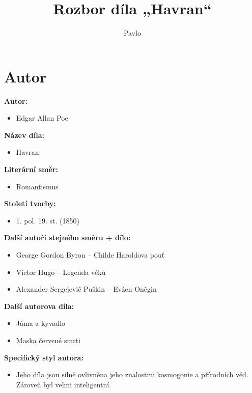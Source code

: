\documentclass[12pt,a4paper]{article}
\title{\textbf{Rozbor díla „Havran“}}
\author{Pavlo }
\begin{document}
\maketitle

\section*{Autor}

\begin{tcolorbox}[breakable]

\textbf{Autor:}
\begin{itemize}
\item Edgar Allan Poe
\end{itemize}

\textbf{Název díla:}
\begin{itemize}
\item Havran
\end{itemize}

\textbf{Literární směr:}
\begin{itemize}
\item Romantismus
\end{itemize}

\textbf{Století tvorby:}
\begin{itemize}
\item 1. pol. 19. st. (1850)
\end{itemize}

\textbf{Další autoři stejného směru + dílo:}
\begin{itemize}
\item George Gordon Byron – Childe Haroldova pouť
\item Victor Hugo – Legenda věků
\item Alexander Sergejevič Puškin – Evžen Oněgin
\end{itemize}

\textbf{Další autorova díla:}
\begin{itemize}
\item Jáma a kyvadlo
\item Maska červené smrti
\end{itemize}

\textbf{Specifický styl autora:}
\begin{itemize}
\item Jeho díla jsou silně ovlivněna jeho znalostmi kosmogonie a přírodních věd. Zároveň byl velmi inteligentní.
\end{itemize}

\end{tcolorbox}
\end{document}
